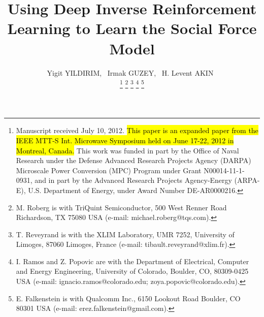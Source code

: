 


\documentclass[conference]{IEEEtran}

\usepackage{xcolor,soul,framed} %

\usepackage[pdftex]{graphicx}
\graphicspath{{../pdf/}{../jpeg/}}

\usepackage[cmex10]{amsmath}
\usepackage{array}
\usepackage{mdwmath}
\usepackage{mdwtab}
\usepackage{eqparbox}
\usepackage{url}





    \title{Using Deep Inverse Reinforcement Learning to Learn the Social Force Model}
  \author{Yigit YILDIRIM,~
      Irmak GUZEY,~
      H. Levent AKIN~%

  \thanks{Manuscript received July 10, 2012. \hl{This paper is an expanded paper from the IEEE MTT-S Int. Microwave Symposium held on June 17-22, 2012 in Montreal, Canada.} This work was funded in part by the Office of Naval Research under the Defense Advanced Research Projects Agency (DARPA) Microscale Power Conversion (MPC) Program under Grant N00014-11-1-0931, and in part by the Advanced Research Projects Agency-Energy (ARPA-E), U.S. Department of Energy, under Award Number DE-AR0000216.}
  \thanks{M. Roberg is with TriQuint Semiconductor, 500 West Renner Road Richardson, TX 75080 USA (e-mail: michael.roberg@tqs.com).}%
  \thanks{T. Reveyrand is with the XLIM Laboratory, UMR 7252, University of Limoges, 87060 Limoges, France (e-mail: tibault.reveyrand@xlim.fr).}%
  \thanks{I. Ramos and Z. Popovic are with the Department of Electrical, Computer and Energy Engineering, University of Colorado, Boulder, CO, 80309-0425 USA (e-mail: ignacio.ramos@colorado.edu; zoya.popovic@colorado.edu).}%
  \thanks{E. Falkenstein is with Qualcomm Inc., 6150 Lookout Road
Boulder, CO 80301 USA (e-mail: erez.falkenstein@gmail.com).}}  


